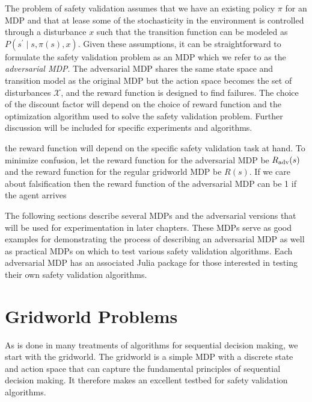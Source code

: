 The problem of safety validation assumes that we have an existing policy $\pi$ for an MDP and that at lease some of the stochasticity in the environment is controlled through a disturbance $x$ such that the transition function can be modeled as $P(s^\prime \mid s, \pi(s), x)$. Given these assumptions, it can be straightforward to formulate the safety validation problem as an MDP which we refer to as the \emph{adversarial MDP}. The adversarial MDP shares the same state space and transition model as the original MDP but the action space becomes the set of disturbances $\mathcal{X}$, and the reward function is designed to find failures. The choice of the discount factor will depend on the choice of reward function and the optimization algorithm used to solve the safety validation problem. Further discussion will be included for specific experiments and algorithms. 

the reward function will depend on the specific safety validation task at hand. To minimize confusion, let the reward function for the adversarial MDP be $R_{\rm adv}(s)$ and the reward function for the regular gridworld MDP be $R(s)$. If we care about falsification then the reward function of the adversarial MDP can be \num{1} if the agent arrives


The following sections describe several MDPs and the adversarial versions that will be used for experimentation in later chapters. These MDPs serve as good examples for demonstrating the process of describing an adversarial MDP as well as practical MDPs on which to test various safety validation algorithms. Each adversarial MDP has an associated Julia package for those interested in testing their own safety validation algorithms. 

\section{Gridworld Problems}
As is done in many treatments of algorithms for sequential decision making, we start with the gridworld. The gridworld is a simple MDP with a discrete state and action space that can capture the fundamental principles of sequential decision making. It therefore makes an excellent testbed for safety validation algorithms. 


